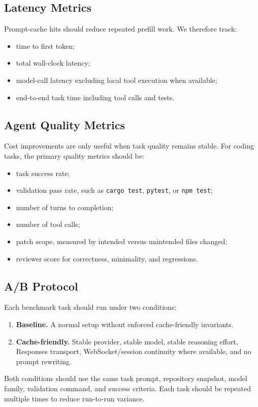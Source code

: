 \subsection{Latency Metrics}

Prompt-cache hits should reduce repeated prefill work. We therefore track:
\begin{itemize}[leftmargin=2em]
    \item time to first token;
    \item total wall-clock latency;
    \item model-call latency excluding local tool execution when available;
    \item end-to-end task time including tool calls and tests.
\end{itemize}

\subsection{Agent Quality Metrics}

Cost improvements are only useful when task quality remains stable. For coding tasks, the primary quality metrics should be:
\begin{itemize}[leftmargin=2em]
    \item task success rate;
    \item validation pass rate, such as \texttt{cargo test}, \texttt{pytest}, or \texttt{npm test};
    \item number of turns to completion;
    \item number of tool calls;
    \item patch scope, measured by intended versus unintended files changed;
    \item reviewer score for correctness, minimality, and regressions.
\end{itemize}

\subsection{A/B Protocol}

Each benchmark task should run under two conditions:
\begin{enumerate}[leftmargin=2em]
    \item \textbf{Baseline.} A normal setup without enforced cache-friendly invariants.
    \item \textbf{Cache-friendly.} Stable provider, stable model, stable reasoning effort, Responses transport, WebSocket/session continuity where available, and no prompt rewriting.
\end{enumerate}
Both conditions should use the same task prompt, repository snapshot, model family, validation command, and success criteria. Each task should be repeated multiple times to reduce run-to-run variance.

